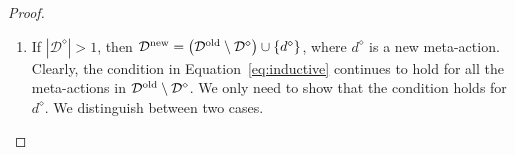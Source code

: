 \begin{proof}
\begin{enumerate}
\begin{enumerate}
\begin{align*}
				&  \le 4 \epsilon (|I^{\textnormal{old}}({d}) |-1 ) + 4 \epsilon  \\ &  \le 4 \epsilon | I^{\textnormal{old}}(d)| \\
				&= 4 \epsilon (|I^{\textnormal{new}}(d) |  - 1),
			\end{align*}
			where the last equality holds since $|I^{\textnormal{new}}(d) | = |I^{\textnormal{old}}(d) | +1$, as $a^\star(p) \notin \bigcup_{d \in \dreg^{\textnormal{old}}} I^{\textnormal{old}}(d)$.
			This proves that Equation~\eqref{eq:inductive} holds for every pair of actions $a,a' \in I^{\textnormal{new}}(d)$ with $a = a^\star(p)$.
			For all the other pairs of actions $a,a' \in I^{\textnormal{new}}(d)$, the equation holds since it was already satisfied before the last execution of Algorithm~\ref{alg:action_oracle}.
			Analogously, given that $I^{\textnormal{new}}(d) = I^{\textnormal{old}}(d)$ for all the meta-actions in $\dreg^{\textnormal{new}} \setminus \{d\}$, we can conclude that the condition in Equation~\eqref{eq:inductive} continues to holds for such meta-actions as well.
		\end{enumerate}
		
		\item  If $|\mathcal{D}^\diamond| > 1$, then $\mathcal{D}^{\textnormal{new}} = \left( \mathcal{D}^{\textnormal{old} } \setminus \mathcal{D}^\diamond \right) \cup \{ d^\diamond \}$, where $d^\diamond$ is a new meta-action.
		Clearly, the condition in Equation~\eqref{eq:inductive} continues to hold for all the meta-actions in $ \mathcal{D}^{\textnormal{old} } \setminus \mathcal{D}^\diamond  $.
		We only need to show that the condition holds for $d^\diamond$.
		We distinguish between two cases.
		\begin{enumerate}
			

\end{enumerate}
\end{enumerate}
\end{proof}

